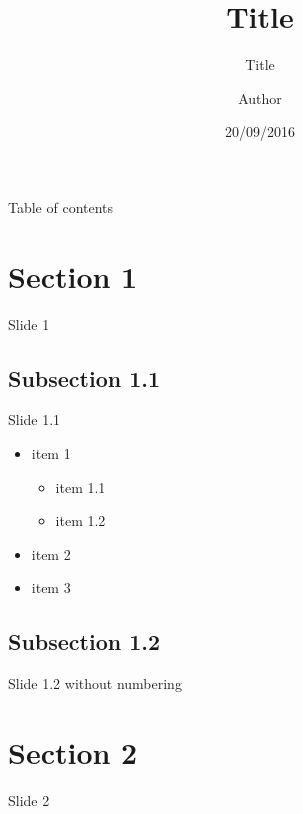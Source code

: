 \documentclass{beamer}
\title{Title}
\subtitle{Title}
\author{Author}
\date{20/09/2016}
\begin{document}
    \begin{frame}
        \maketitle
    \end{frame}
    
    \begin{frame}{Table of contents}
      \tableofcontents
    \end{frame}
    
    \section{Section 1}
    \begin{frame}{Slide 1}
        \lipsum[1]
    \end{frame}
    
    \subsection{Subsection 1.1}
    \begin{frame}{Slide 1.1}
        \begin{itemize}
            \item item 1
            \begin{itemize}
                \item item 1.1
                \item item 1.2
            \end{itemize}
            \item item 2
            \item item 3
        \end{itemize}
    \end{frame}
    
    \subsection{Subsection 1.2}
    \begin{frame}[plain]{Slide 1.2 without numbering}
        \lipsum[2]
        \addtocounter{page}{-1}
    \end{frame}
    
    \section{Section 2}
    \begin{frame}{Slide 2}
        \lipsum[3]
    \end{frame}
\end{document}
